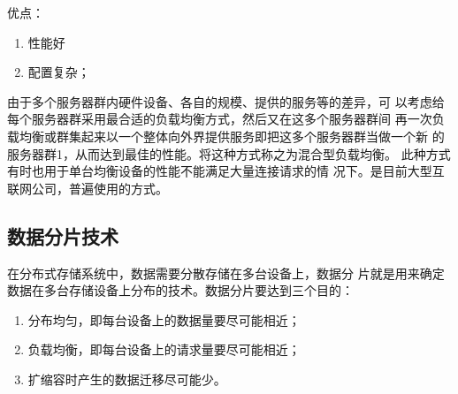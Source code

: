 \noindent
优点：
\begin{enumerate}
	\item 性能好
	\item 配置复杂；
\end{enumerate}

由于多个服务器群内硬件设备、各自的规模、提供的服务等的差异，可
以考虑给每个服务器群采用最合适的负载均衡方式，然后又在这多个服务器群间
再一次负载均衡或群集起来以一个整体向外界提供服务即把这多个服务器群当做一个新
的服务器群1，从而达到最佳的性能。将这种方式称之为混合型负载均衡。
此种方式有时也用于单台均衡设备的性能不能满足大量连接请求的情
况下。是目前大型互联网公司，普遍使用的方式。
\subsection{数据分片技术}
在分布式存储系统中，数据需要分散存储在多台设备上，数据分
片就是用来确定数据在多台存储设备上分布的技术。数据分片要达到三个目的：
\begin{enumerate}
	\item 分布均匀，即每台设备上的数据量要尽可能相近；
	\item 负载均衡，即每台设备上的请求量要尽可能相近；
	\item 扩缩容时产生的数据迁移尽可能少。
\end{enumerate}

